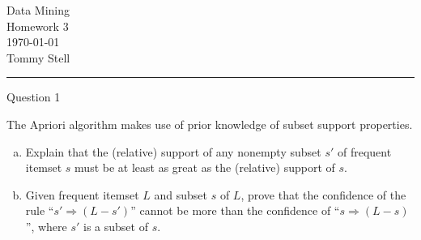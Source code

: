 \documentclass[12pt,letterpaper, onecolumn]{exam}
\begin{document}
\begingroup
    \centering
    \LARGE Data Mining\\
    \LARGE Homework 3\\[0.5em]
    \large \today\\[0.5em]
    \large Tommy Stell\par

\endgroup
\rule{\textwidth}{0.4pt}
\pointsdroppedatright   %
\printanswers
\renewcommand{\solutiontitle}{\noindent\textbf{Ans:}\enspace}   %

\begin{questions}

    \question Question 1

    The Apriori algorithm makes use of prior knowledge of subset support properties.
    \begin{enumerate}[a.)]
        \item Explain that the (relative) support of any nonempty subset $s'$ of frequent itemset $s$ must be at least as great as the (relative) support of $s$.
        \item Given frequent itemset $L$ and subset $s$ of $L$, prove that the confidence of the rule ``$s' \Rightarrow (L - s')$'' cannot be more than the confidence of ``$s \Rightarrow (L - s)$'', where $s'$ is a subset of $s$.
    \end{enumerate}

    \begin{solution}


\end{solution}
\end{questions}
\end{document}
